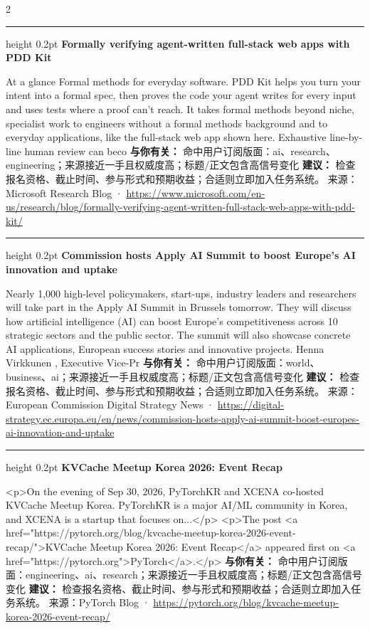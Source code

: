 \documentclass[10.5pt]{ctexart}
\begin{document}
\begin{multicols}{2}
\vspace{2mm}
\hrule height 0.2pt
\vspace{2mm}
{\large\bfseries Formally verifying agent-written full-stack web apps with PDD Kit}\par
At a glance Formal methods for everyday software. PDD Kit helps you turn your intent into a formal spec, then proves the code your agent writes for every input and uses tests where a proof can’t reach. It takes formal methods beyond niche, specialist work to engineers without a formal methods background and to everyday applications, like the full-stack web app shown here. Exhaustive line-by-line human review can beco
\textbf{与你有关：} 命中用户订阅版面：ai、research、engineering；来源接近一手且权威度高；标题/正文包含高信号变化
\textbf{建议：} 检查报名资格、截止时间、参与形式和预期收益；合适则立即加入任务系统。
{\footnotesize\color{ormuted} 来源：Microsoft Research Blog · \url{https://www.microsoft.com/en-us/research/blog/formally-verifying-agent-written-full-stack-web-apps-with-pdd-kit/}}
\vspace{2mm}
\hrule height 0.2pt
\vspace{2mm}
{\large\bfseries Commission hosts Apply AI Summit to boost Europe’s AI innovation and uptake}\par
Nearly 1,000 high-level policymakers, start-ups, industry leaders and researchers will take part in the Apply AI Summit in Brussels tomorrow. They will discuss how artificial intelligence (AI) can boost Europe’s competitiveness across 10 strategic sectors and the public sector. The summit will also showcase concrete AI applications, European success stories and innovative projects. Henna Virkkunen , Executive Vice-Pr
\textbf{与你有关：} 命中用户订阅版面：world、business、ai；来源接近一手且权威度高；标题/正文包含高信号变化
\textbf{建议：} 检查报名资格、截止时间、参与形式和预期收益；合适则立即加入任务系统。
{\footnotesize\color{ormuted} 来源：European Commission Digital Strategy News · \url{https://digital-strategy.ec.europa.eu/en/news/commission-hosts-apply-ai-summit-boost-europes-ai-innovation-and-uptake}}
\vspace{2mm}
\hrule height 0.2pt
\vspace{2mm}
{\large\bfseries KVCache Meetup Korea 2026: Event Recap}\par
<p>On the evening of Sep 30, 2026, PyTorchKR and XCENA co-hosted KVCache Meetup Korea. PyTorchKR is a major AI/ML community in Korea, and XCENA is a startup that focuses on...</p> <p>The post <a href="https://pytorch.org/blog/kvcache-meetup-korea-2026-event-recap/">KVCache Meetup Korea 2026: Event Recap</a> appeared first on <a href="https://pytorch.org">PyTorch</a>.</p>
\textbf{与你有关：} 命中用户订阅版面：engineering、ai、research；来源接近一手且权威度高；标题/正文包含高信号变化
\textbf{建议：} 检查报名资格、截止时间、参与形式和预期收益；合适则立即加入任务系统。
{\footnotesize\color{ormuted} 来源：PyTorch Blog · \url{https://pytorch.org/blog/kvcache-meetup-korea-2026-event-recap/}}
\end{multicols}
\end{document}
